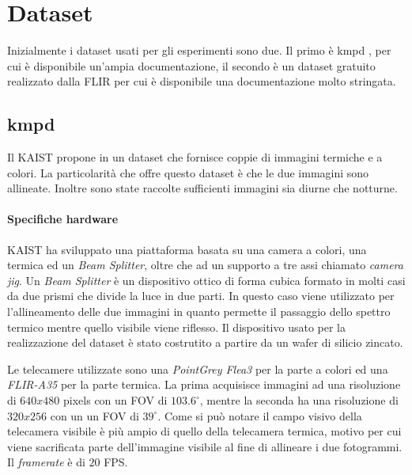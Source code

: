 \label{chap:sistema}

\section{Dataset}
\label{sec:dataset}
Inizialmente i dataset usati per gli esperimenti sono due. Il primo è \ac{kmpd} \cite{DBLP:conf/cvpr/HwangPKCK15}, 
per cui è disponibile un'ampia documentazione, il secondo è un dataset gratuito realizzato dalla FLIR \cite{FLIRAdas} per cui è disponibile una documentazione molto stringata.
\subsection{\acl{kmpd}}
\label{subsec:kmpd}
Il \ac{KAIST} propone in \cite{DBLP:conf/cvpr/HwangPKCK15} un dataset che fornisce coppie di immagini termiche e a colori. La particolarità che offre questo dataset è che le due immagini sono allineate. Inoltre sono state raccolte sufficienti immagini sia diurne che notturne.
\paragraph{Specifiche hardware}
\ac{KAIST} ha sviluppato una piattaforma basata su una camera a colori, una termica ed un \textit{Beam Splitter}, oltre che ad un supporto a tre assi chiamato \textit{camera jig}. Un \textit{Beam Splitter} è un dispositivo ottico di forma cubica formato in molti casi da due prismi che divide la luce in due parti. In questo caso viene utilizzato per l'allineamento delle due immagini in quanto permette il passaggio dello spettro termico mentre quello visibile viene riflesso. Il dispositivo usato per la realizzazione del dataset è stato costrutito a partire da un wafer di silicio zincato.

Le telecamere utilizzate sono una \textit{PointGrey Flea3} per la parte a colori ed una \textit{FLIR-A35} per la parte termica. La prima acquisisce immagini ad una risoluzione di $640 x 480$ pixels con un \ac{FOV} di $103.6^\circ$, mentre la seconda ha una risoluzione di $320 x 256$ con un un \ac{FOV} di $39^\circ$. Come si può notare il campo visivo della telecamera visibile è più ampio di quello della telecamera termica, motivo per cui viene sacrificata parte dell'immagine visibile al fine di allineare i due fotogrammi. Il \textit{framerate} è di $20$ FPS.
